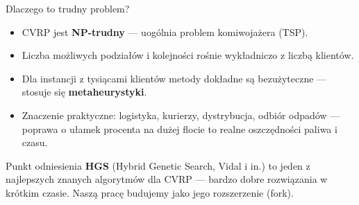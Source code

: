 \documentclass[aspectratio=169,11pt]{beamer}
\begin{document}
\begin{frame}{Dlaczego to trudny problem?}
  \begin{itemize}
    \item CVRP jest \textbf{NP-trudny} — uogólnia problem komiwojażera (TSP).
    \item Liczba możliwych podziałów i kolejności rośnie wykładniczo z liczbą klientów.
    \item Dla instancji z tysiącami klientów metody dokładne są bezużyteczne — stosuje się \textbf{metaheurystyki}.
    \item Znaczenie praktyczne: logistyka, kurierzy, dystrybucja, odbiór odpadów — poprawa o ułamek procenta na dużej flocie to realne oszczędności paliwa i czasu.
  \end{itemize}
  \vfill
  \begin{block}{Punkt odniesienia}
    \textbf{HGS} (Hybrid Genetic Search, Vidal i in.) to jeden z najlepszych znanych algorytmów dla CVRP — bardzo dobre rozwiązania w krótkim czasie. Naszą pracę budujemy jako jego rozszerzenie (fork).
  \end{block}
\end{frame}

\end{document}
